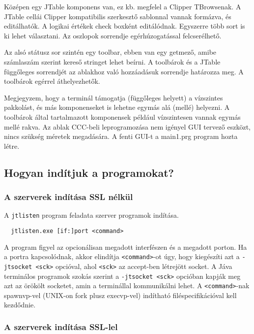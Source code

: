 
Középen egy JTable komponens van, ez kb. megfelel a Clipper
TBrowsenak.  A JTable cellái Clipper
kompatibilis szerkesztő sablonnal vannak formázva, és editálhatók.
A logikai értékek check boxként editálódnak.
Egyszerre több sort is ki lehet választani.
Az oszlopok sorrendje egérhúzogatással felcserélhető.
 
Az alsó státusz sor szintén egy toolbar,  ebben van egy getmező,
amibe számlaszám szerint kereső  stringet lehet beírni.
A toolbárok és a JTable függőleges sorrendjét az ablakhoz való
hozzáadásuk sorrendje határozza meg.
A toolbárok egérrel áthelyezhetők.

Megjegyzem, hogy a terminál támogatja (függőleges helyett) a vízszintes
pakkolást, és más komponenseket is lehetne egymás alá (mellé)
helyezni. A toolbárok által tartalmazott komponensek például
vízszintesen vannak egymás mellé rakva.
Az ablak CCC-beli leprogramozása nem igényel GUI tervező eszközt,
nincs szükség méretek megadására. 
A fenti GUI-t a main1.prg program hozta létre.


\subsection{Hogyan indítjuk a programokat?}

\subsubsection{A szerverek indítása SSL nélkül}

A \verb!jtlisten! program feladata  szerver programok indítása.
\begin{verbatim}
  jtlisten.exe [if:]port <command>
\end{verbatim}
A program figyel az opcionálisan megadott interfészen és a megadott 
porton. Ha a portra kapcsolódnak, akkor elindítja \verb!<command>!-ot úgy, 
hogy kiegészíti azt a  \verb!-jtsocket <sck>! opcióval,
ahol \verb!<sck>! az accept-ben létrejött socket.
A Jáva terminálos programok szokás szerint a \verb!-jtsocket <sck>! opcióban 
kapják meg azt az örökölt socketet, amin a terminállal kommunikálni lehet.
A \verb!<command>!-nak spawnvp-vel (UNIX-on fork plusz execvp-vel) 
indítható  filéspecifikációval kell kezdődnie.
 


\subsubsection{A szerverek indítása SSL-lel}
 

